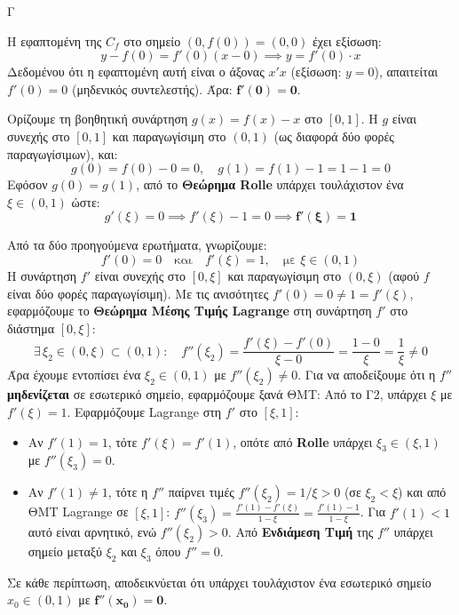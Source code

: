 \begin{thema}{Γ}
\begin{erwthma}
\item Η εφαπτομένη της $C_f$ στο σημείο $(0, f(0)) = (0, 0)$ έχει εξίσωση:
\[ y - f(0) = f'(0)(x - 0) \implies y = f'(0) \cdot x \]
Δεδομένου ότι η εφαπτομένη αυτή είναι ο άξονας $x'x$ (εξίσωση: $y = 0$), απαιτείται $f'(0) = 0$ (μηδενικός συντελεστής).
Άρα: $\boldsymbol{f'(0) = 0}$.

\item Ορίζουμε τη βοηθητική συνάρτηση $g(x) = f(x) - x$ στο $[0, 1]$.
Η $g$ είναι συνεχής στο $[0,1]$ και παραγωγίσιμη στο $(0,1)$ (ως διαφορά δύο φορές παραγωγίσιμων), και:
\[ g(0) = f(0) - 0 = 0, \quad g(1) = f(1) - 1 = 1 - 1 = 0 \]
Εφόσον $g(0) = g(1)$, από το \textbf{Θεώρημα Rolle} υπάρχει τουλάχιστον ένα $\xi \in (0,1)$ ώστε:
\[ g'(\xi) = 0 \implies f'(\xi) - 1 = 0 \implies \boldsymbol{f'(\xi) = 1} \]

\item Από τα δύο προηγούμενα ερωτήματα, γνωρίζουμε:
\[ f'(0) = 0 \quad \text{και} \quad f'(\xi) = 1, \quad \text{με } \xi \in (0,1) \]
Η συνάρτηση $f'$ είναι συνεχής στο $[0, \xi]$ και παραγωγίσιμη στο $(0, \xi)$ (αφού $f$ είναι δύο φορές παραγωγίσιμη). Με τις ανισότητες $f'(0) = 0 \neq 1 = f'(\xi)$, εφαρμόζουμε το \textbf{Θεώρημα Μέσης Τιμής Lagrange} στη συνάρτηση $f'$ στο διάστημα $[0, \xi]$:
\[ \exists\, \xi_2 \in (0, \xi) \subset (0, 1): \quad f''(\xi_2) = \frac{f'(\xi) - f'(0)}{\xi - 0} = \frac{1 - 0}{\xi} = \frac{1}{\xi} \neq 0 \]
Άρα έχουμε εντοπίσει ένα $\xi_2 \in (0,1)$ με $f''(\xi_2) \neq 0$. Για να αποδείξουμε ότι η $f''$ \textbf{μηδενίζεται} σε εσωτερικό σημείο, εφαρμόζουμε ξανά ΘΜΤ: Από το Γ2, υπάρχει $\xi$ με $f'(\xi) = 1$. Εφαρμόζουμε Lagrange στη $f'$ στο $[\xi, 1]$:
\begin{itemize}
    \item Αν $f'(1) = 1$, τότε $f'(\xi) = f'(1)$, οπότε από \textbf{Rolle} υπάρχει $\xi_3 \in (\xi, 1)$ με $f''(\xi_3) = 0$.
    \item Αν $f'(1) \neq 1$, τότε η $f''$ παίρνει τιμές $f''(\xi_2) = 1/\xi > 0$ (σε $\xi_2 < \xi$) και από ΘΜΤ Lagrange σε $[\xi, 1]$: $f''(\xi_3) = \frac{f'(1)-f'(\xi)}{1-\xi} = \frac{f'(1)-1}{1-\xi}$. Για $f'(1) < 1$ αυτό είναι αρνητικό, ενώ $f''(\xi_2) > 0$. Από \textbf{Ενδιάμεση Τιμή} της $f''$ υπάρχει σημείο μεταξύ $\xi_2$ και $\xi_3$ όπου $f'' = 0$.
\end{itemize}
Σε κάθε περίπτωση, αποδεικνύεται ότι υπάρχει τουλάχιστον ένα εσωτερικό σημείο $x_0 \in (0,1)$ με $\boldsymbol{f''(x_0) = 0}$.


\end{erwthma}
\end{thema}
